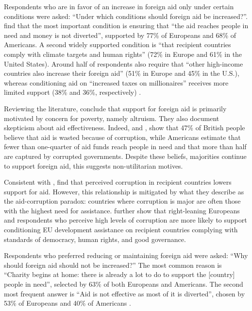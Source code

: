 
Respondents who are in favor of an increase in foreign aid only under certain conditions were asked: ``Under which conditions should foreign aid be increased?''. \citet{fabre_majority_2025} find that the most important condition is ensuring that ``the aid reaches people in need and money is not diverted'', supported by 77\% of Europeans and 68\% of Americans. A second widely supported condition is ``that recipient countries comply with climate targets and human rights'' (72\% in Europe and 61\% in the United States). Around half of respondents also require that ``other high-income countries also increase their foreign aid'' (51\% in Europe and 45\% in the U.S.), whereas conditioning aid on ``increased taxes on millionaires'' receives more limited support (38\% and 36\%, respectively) \citep[Figure 7]{fabre_majority_2025}.

Reviewing the literature, \citet{hudson_mile_2012} conclude that support for foreign aid is primarily motivated by concern for poverty, namely altruism. They also document skepticism about aid effectiveness. Indeed, \citet{dfid_aid_2009} and \citet{PIPA2001}, show that 47\% of British people believe that aid is wasted because of corruption, while Americans estimate that fewer than one-quarter of aid funds reach people in need and that more than half are captured by corrupted governments. Despite these beliefs, majorities continue to support foreign aid, this suggests non-utilitarian motives.

Consistent with \citet{henson_public_2010}, \citet{bauhr_corruption_2013} find that perceived corruption in recipient countries lowers support for aid. However, this relationship is mitigated by what they describe as the aid-corruption paradox: countries where corruption is major are often those with the highest need for assistance. \citet{bodenstein_who_2017} further show that right-leaning Europeans and respondents who perceive high levels of corruption are more likely to support conditioning EU development assistance on recipient countries complying with standards of democracy, human rights, and good governance.

Respondents who preferred reducing or maintaining foreign aid were asked: ``Why should foreign aid should not be increased?'' The most common reason is ``Charity begins at home: there is already a lot to do to support the [country] people in need'', selected by 63\% of both Europeans and Americans. The second most frequent answer is ``Aid is not effective as most of it is diverted'', chosen by 53\% of Europeans and 40\% of Americans \citep[Figure 7]{fabre_majority_2025}.%


